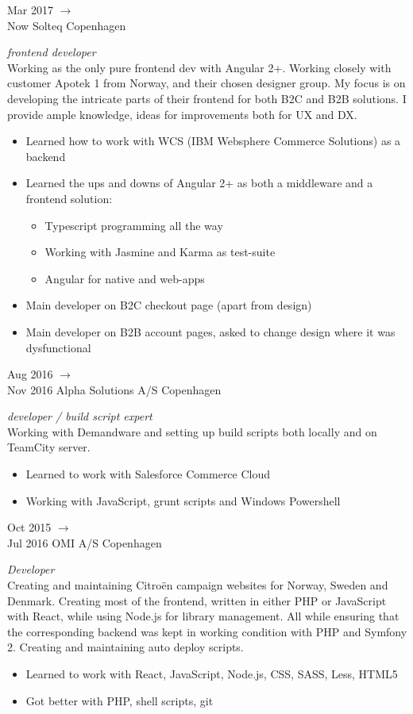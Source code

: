 \documentclass[]{friggeri-cv} %
\begin{document}
\begin{entrylist}


\entry
{Mar 2017 $\rightarrow$ \\ Now}
{Solteq}
{Copenhagen}
{\emph{frontend developer} \\
Working as the only pure frontend dev with Angular 2+. Working closely with customer Apotek 1 from Norway, and their chosen designer group. My focus is on developing the intricate parts of their frontend for both B2C and B2B solutions. I provide ample knowledge, ideas for improvements both for UX and DX.
\begin{itemize}
\item Learned how to work with WCS (IBM Websphere Commerce Solutions) as a backend
\item Learned the ups and downs of Angular 2+ as both a middleware and a frontend solution:
\begin{itemize}
\item Typescript programming all the way
\item Working with Jasmine and Karma as test-suite
\item Angular for native and web-apps
\end{itemize}
\item Main developer on B2C checkout page (apart from design)
\item Main developer on B2B account pages, asked to change design where it was dysfunctional
\end{itemize}}

\entry
{Aug 2016 $\rightarrow$ \\ Nov 2016}
{Alpha Solutions A/S}
{Copenhagen}
{\emph{developer / build script expert} \\ 
Working with Demandware and setting up build scripts both locally and on TeamCity server.
\begin{itemize}
\item Learned to work with Salesforce Commerce Cloud
\item Working with JavaScript, grunt scripts and Windows Powershell
\end{itemize}
}

\entry
{Oct 2015 $\rightarrow$ \\ Jul 2016}
{OMI A/S}
{Copenhagen}
{\emph{Developer} \\
Creating and maintaining Citroën campaign websites for Norway, Sweden and Denmark.
Creating most of the frontend, written in either PHP or JavaScript with React, while using Node.js 
for library management.
All while ensuring that the corresponding backend was kept in working condition with PHP and Symfony 2. 
Creating and maintaining auto deploy scripts.\\
\begin{itemize}
	\item Learned to work with React, JavaScript, Node.js, CSS, SASS, Less, HTML5
	\item Got better with PHP, shell scripts, git
\end{itemize}
}


\end{entrylist}
\end{document}
